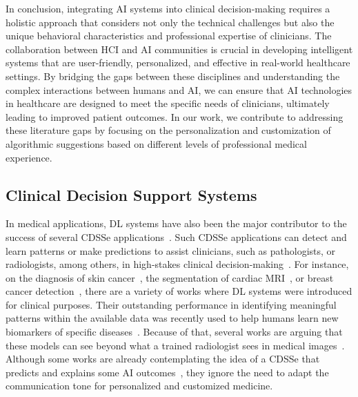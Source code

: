 In conclusion, integrating \ac{AI} systems into clinical decision-making requires a holistic approach that considers not only the technical challenges but also the unique behavioral characteristics and professional expertise of clinicians.
The collaboration between \ac{HCI} and \ac{AI} communities is crucial in developing intelligent systems that are user-friendly, personalized, and effective in real-world healthcare settings.
By bridging the gaps between these disciplines and understanding the complex interactions between humans and \ac{AI}, we can ensure that \ac{AI} technologies in healthcare are designed to meet the specific needs of clinicians, ultimately leading to improved patient outcomes.
In our work, we contribute to addressing these literature gaps by focusing on the personalization and customization of algorithmic suggestions based on different levels of professional medical experience.

\subsection{Clinical Decision Support Systems}
\label{sec:app005003003}

In medical applications, \ac{DL} systems have also been the major contributor to the success of several \ac{CDSSe} applications~\cite{esteva2019guide}.
Such \ac{CDSSe} applications can detect and learn patterns or make predictions to assist clinicians, such as pathologists, or radiologists, among others, in high-stakes clinical decision-making~\cite{10.1145/3555157}.
For instance, on the diagnosis of skin cancer~\cite{esteva2017dermatologist}, the segmentation of cardiac \ac{MRI}~\cite{8759179}, or breast cancer detection~\cite{MAICAS2019101562}, there are a variety of works where \ac{DL} systems were introduced for clinical purposes.
Their outstanding performance in identifying meaningful patterns within the available data was recently used to help humans learn new biomarkers of specific diseases~\cite{wang2019deep}.
Because of that, several works are arguing that these models can see beyond what a trained radiologist sees in medical images~\cite{mckinney2020international, Rajpurkar2022, MAIERHEIN2022102306}.
Although some works are already contemplating the idea of a \ac{CDSSe} that predicts and explains some \ac{AI} outcomes~\cite{MAICAS2019101562, CALISTO2022102285}, they ignore the need to adapt the communication tone for personalized and customized medicine.

